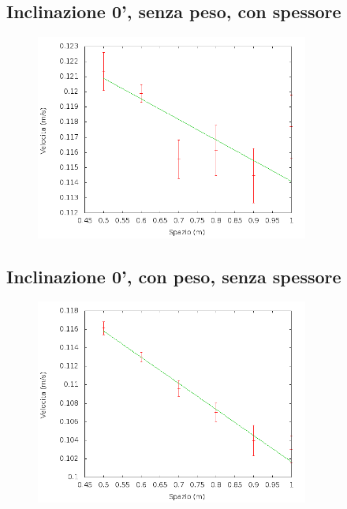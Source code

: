 \documentclass[12pt]{article} %
\begin{document}
	\subsection {Inclinazione 0', senza peso, con spessore}
	\begin{figure}[H]
		\centering
		\includegraphics[width=0.8\textwidth]{velocita_0gradi_alluminio}
		\label{fig:0a}
	\end{figure}
 
 
	\subsection {Inclinazione 0', con peso, senza spessore}
		\begin{figure}[H]
		\centering
		\includegraphics[width=0.8\textwidth]{velocita_0gradi_peso}
		\label{fig:0p}
	\end{figure}
 
\end{document}
